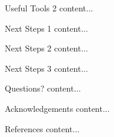 \documentclass{beamer}
\begin{document}
\begin{frame}{Useful Tools 2}
	content...
\end{frame}

\begin{frame}{Next Steps 1}
	content...
\end{frame}

\begin{frame}{Next Steps 2}
	content...
\end{frame}

\begin{frame}{Next Steps 3}
	content...
\end{frame}

\begin{frame}{Questions?}
	content...
\end{frame}

\begin{frame}{Acknowledgements}
	content...
\end{frame}

\begin{frame}{References}
	content...
\end{frame}
\end{document}
